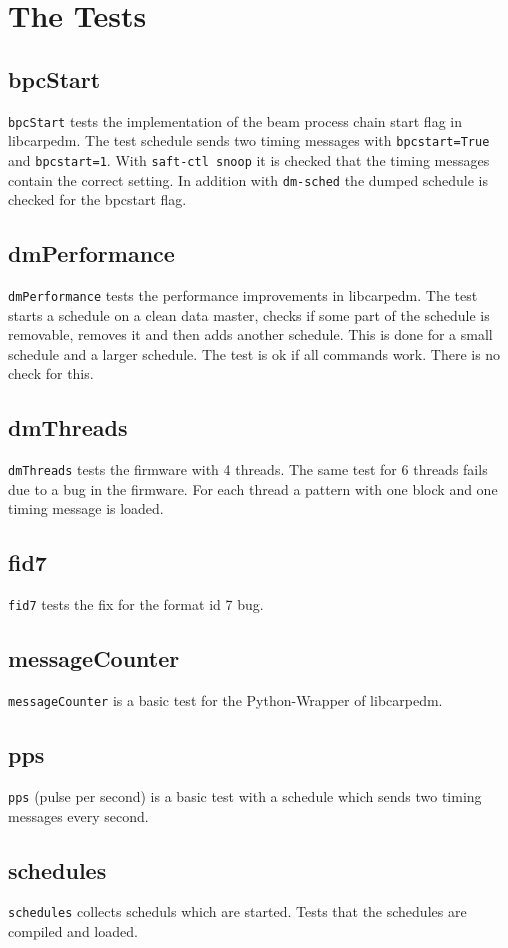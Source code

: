 \documentclass[12pt,a4paper]{report}
\begin{document}
\chapter{The Tests}
\section{bpcStart}
\texttt{bpcStart} tests the implementation of the beam process chain start flag in libcarpedm.
The test schedule sends two timing messages with \texttt{bpcstart=True} and \texttt{bpcstart=1}.
With \texttt{saft-ctl snoop} it is checked that the timing messages contain the correct setting.
In addition with \texttt{dm-sched} the dumped schedule is checked for the bpcstart flag.
\section{dmPerformance}
\texttt{dmPerformance} tests the performance improvements in libcarpedm.
The test starts a schedule on a clean data master, checks if some part of the schedule is removable, removes it and
then adds another schedule. This is done for a small schedule and a larger schedule. The test is ok if all commands
work. There is no check for this.
\section{dmThreads}
\texttt{dmThreads} tests the firmware with 4 threads. The same test for 6 threads fails due to a bug in the
firmware. For each thread a pattern with one block and one timing message is loaded.
\section{fid7}
\texttt{fid7} tests the fix for the format id 7 bug.

\section{messageCounter}
\texttt{messageCounter} is a basic test for the Python-Wrapper of libcarpedm.
\section{pps}
\texttt{pps} (pulse per second) is a basic test with a schedule which sends two timing messages every second.
\section{schedules}
\texttt{schedules} collects scheduls which are started. Tests that the schedules are compiled and loaded.

\end{document}

